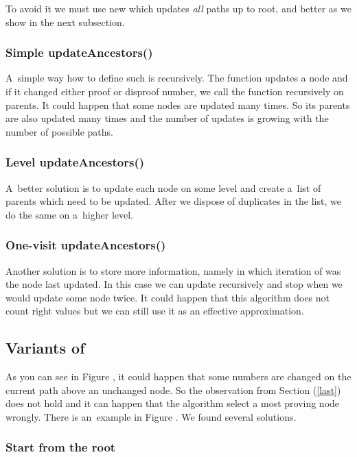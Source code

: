 To avoid it we must use new  which updates \emph{all}
paths up to root, and better  as we show in the next
subsection. 

\subsubsection{Simple updateAncestors()}

A~simple way how to define such  is recursively. The
function updates a node and if it changed either proof or disproof
number, we call the function recursively on parents. It could happen that
some nodes are updated many times. So its parents are also updated many times
and the number of updates is growing with the number of possible paths.

\subsubsection{Level updateAncestors()}

A~better solution is to update each node on some level and create a~list of
parents which need to be updated. After we dispose of duplicates in the list,
we do the same on a~higher level. 

\subsubsection{One-visit updateAncestors()}

Another solution is to store more information, namely in which iteration of
 was the node last updated. In this case we can update
recursively and stop when we would update some node twice. It could happen
that this algorithm does not count right values but we can still use it as an effective 
approximation.

\subsection{Variants of }

As you can see in Figure , it could happen that some numbers are changed on
the current path above an unchanged node. So the observation from Section  (\ref{last}) does not hold and it can happen that the algorithm select a most
proving node wrongly. There is an~example in Figure . We found several solutions.

\subsubsection{Start from the root}


